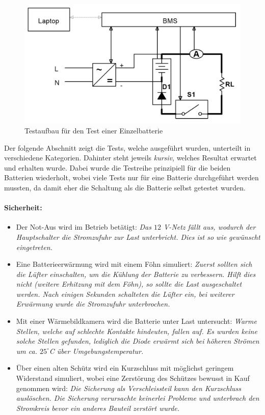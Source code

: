 \begin{figure}[h]
	\centering
		\includegraphics[width=.80\textwidth]{images/Testaufbau.png}
	\caption{Testaufbau für den Test einer Einzelbatterie}
	\label{fig:Testaufbau}
\end{figure}

Der folgende Abschnitt zeigt die Tests, welche ausgeführt wurden, unterteilt in verschiedene Kategorien. Dahinter steht jeweils \textit{kursiv}, welches Resultat erwartet und erhalten wurde. Dabei wurde die Testreihe prinzipiell für die beiden Batterien wiederholt, wobei viele Tests nur für eine Batterie durchgeführt werden mussten, da damit eher die Schaltung als die Batterie selbst getestet wurden.

\paragraph{Sicherheit:} \begin{itemize}
	\item Der Not-Aus wird im Betrieb betätigt: \textit{Das $12$ V-Netz fällt aus, wodurch der Hauptschalter die Stromzufuhr zur Last unterbricht. Dies ist so wie gewünscht eingetreten.}
	\item Eine Batterieerwärmung wird mit einem Föhn simuliert: \textit{Zuerst sollten sich die Lüfter einschalten, um die Kühlung der Batterie zu verbessern. Hilft dies nicht (weitere Erhitzung mit dem Föhn), so sollte die Last ausgeschaltet werden. Nach einigen Sekunden schalteten die Lüfter ein, bei weiterer Erwärmung wurde die Stromzufuhr unterbrochen.}
	\item Mit einer Wärmebildkamera wird die Batterie unter Last untersucht: \textit{Warme Stellen, welche auf schlechte Kontakte hindeuten, fallen auf. Es wurden keine solche Stellen gefunden, lediglich die Diode erwärmt sich bei höheren Strömen um ca. $25^\circ$C über Umgebungstemperatur.}
	\item Über einen alten Schütz wird ein Kurzschluss mit möglichst geringem Widerstand simuliert, wobei eine Zerstörung des Schützes bewusst in Kauf genommen wird: \textit{Die Sicherung als Verschleissteil kann den Kurzschluss auslöschen. Die Sicherung verursachte keinerlei Probleme und unterbrach den Stromkreis bevor ein anderes Bauteil zerstört wurde.}
\end{itemize} \newpage

